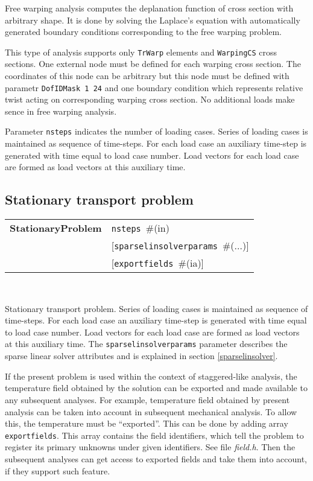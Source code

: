 \documentclass[a4paper]{article}
\makeatletter
\newcommand{\param}[1]{\texttt{#1}} %
\newcommand{\optional}[1]{[#1]} %
\newcommand{\field}[2]{\param{#1}~\#{\tiny(#2)}} %
\newcommand{\optField}[2]{\optional{\field{#1}{#2}}}
\newcommand{\entKeywordInst}[1]{\textbf{#1}} %
\newenvironment{record}[1][]{\begin{tabular}{|ll}}{\end{tabular}\\}
\newcommand{\recentry}[2]{{#1}&{#2}\\}
\newcounter{rcc}
\newenvironment{record}[1][\textwidth]{\setcounter{rcc}{0}\begin{tabular*}{#1}{|ll@{\extracolsep{\fill}}r}}{\end{tabular*}\\}
\newcommand{\recentry}[2]{\ifthenelse{\value{rcc}>0}{&$\backslash$ \\}{\setcounter{rcc}{1}}{#1}&{#2}}
\makeatother
\begin{document}
Free warping analysis computes the deplanation function of cross section with arbitrary shape. It is done by solving the Laplace's equation with automatically generated boundary conditions corresponding to the free warping problem.

This type of analysis supports only \param{TrWarp} elements and \param{WarpingCS} cross sections. One external node must be defined for each warping cross section. The coordinates of this node can be arbitrary but this node must be defined with parametr  \param{DofIDMask 1 24} and one boundary condition which represents relative twist acting on corresponding warping cross section. No additional loads make sence in free warping analysis.

Parameter \param{nsteps} indicates the number of loading cases.
Series of loading cases is maintained as sequence of time-steps.
For each load case an auxiliary time-step is generated with time
equal to load case number.
Load vectors for each load case are formed as load vectors at
this auxiliary time.


\subsection{Stationary transport problem}
\label{StationaryTransport}

\begin{record}
  \recentry{\entKeywordInst{StationaryProblem}}{\field{nsteps}{in}}
  \recentry{}{\optField{sparselinsolverparams}{...}}
  \recentry{}{\optField{exportfields}{ia}}
\end{record}

Stationary transport problem.
Series of loading cases is maintained as sequence of time-steps.
For each load case an auxiliary time-step is generated with time
equal to load case number.
Load vectors for each load case are formed as load vectors at
this auxiliary time.
The  \param{sparselinsolverparams} parameter describes the sparse
linear solver attributes and is explained in section \ref{sparselinsolver}.

If the present problem is used within the context
of staggered-like analysis, the temperature field obtained by the
solution can be exported and made available to any subsequent
analyses. For example, temperature field obtained by present analysis
can be taken into account in subsequent mechanical analysis.
To allow this, the temperature must be ``exported''. This can be done
by adding array \param{exportfields}. This array contains the field
identifiers, which tell the problem to register its primary unknowns
under given identifiers. See file {\it field.h}.
Then the subsequent analyses can get access to exported fields 
and take them into account, if they support such feature.
\end{document}
